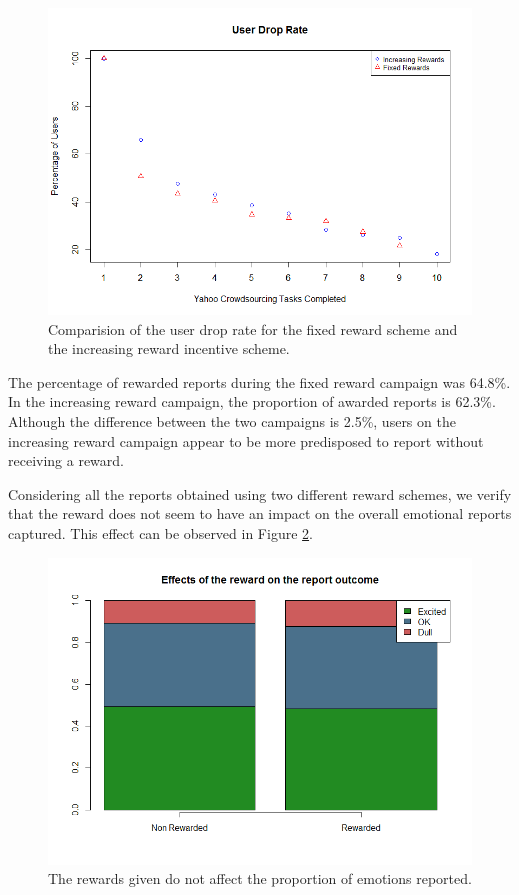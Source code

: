 \documentclass[letterpaper]{article}
\begin{document}
\begin{figure}[htb]
	\begin{center}
		\includegraphics[width=1\linewidth]{images/UserDropRate}
		\caption{Comparision of the user drop rate for the fixed reward scheme and the increasing reward incentive scheme.\label{fig:UserDropRate}}
	\end{center}
\end{figure}

The percentage of rewarded reports during the fixed reward campaign was 64.8\%.
In the increasing reward campaign, the proportion of awarded reports is 62.3\%. Although the difference between the two campaigns is 2.5\%, users on the increasing reward campaign appear to be more predisposed to report without receiving a reward.

Considering all the reports obtained using two different reward schemes, we verify that the reward does not seem to have an impact on the overall emotional reports captured. This effect can be observed in Figure \ref{fig:RewardedvsNonRewarded}.
 
\begin{figure}[htb]
	\begin{center}
		\includegraphics[width=1\linewidth]{images/RewardedvsNonRewarded}
		\caption{The rewards given do not affect the proportion of emotions reported.\label{fig:RewardedvsNonRewarded}}
	\end{center}
\end{figure}
\end{document}
